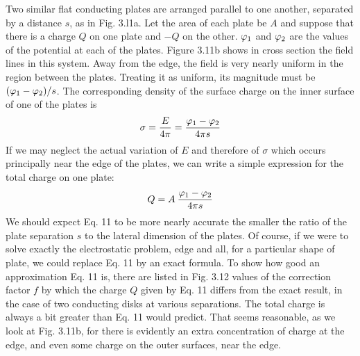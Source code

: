 Two similar flat conducting plates are arranged parallel to one
another, separated by a distance $s$, as in Fig. 3.l1a. Let the area of
each plate be $A$ and suppose that there is a charge $Q$ on one plate
and $-Q$ on the other. $\varphi_1$ and $\varphi_2$ are the values of the potential at
each of the plates. Figure 3.11b shows in cross section the field lines
in this system. Away from the edge, the field is very nearly uniform
in the region between the plates. Treating it as uniform, its magnitude
must be $(\varphi_1-\varphi_2)/s$. The corresponding density of the surface
charge on the inner surface of one of the plates is
\begin{equation}
  \sigma = \frac{E}{4\pi} = \frac{\varphi_1-\varphi_2}{4\pi s}
\end{equation}
If we may neglect the actual variation of $E$ and therefore of $\sigma$ which
occurs principally near the edge of the plates, we can write a simple
expression for the total charge on one plate:
\begin{equation}
  Q = A \: \frac{\varphi_1-\varphi_2}{4\pi s}
\end{equation}
We should expect Eq. 11 to be more nearly accurate the smaller
the ratio of the plate separation $s$ to the lateral dimension of the
plates. Of course, if we were to solve exactly the electrostatic problem,
edge and all, for a particular shape of plate, we could replace
Eq. 11 by an exact formula. To show how good an approximation
Eq. 11 is, there are listed in Fig. 3.12 values of the correction factor $f$
by which the charge $Q$ given by Eq. 11 differs from the exact result,
in the case of two conducting disks at various separations. The
total charge is always a bit greater than Eq. 11 would predict. That
seems reasonable, as we look at Fig. 3.11b, for there is evidently an
extra concentration of charge at the edge, and even some charge on
the outer surfaces, near the edge.

